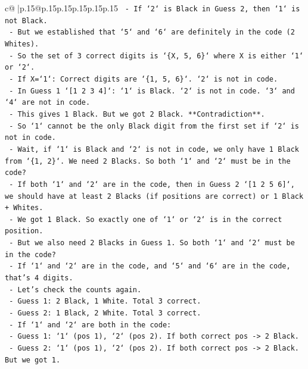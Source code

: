 \documentclass{article}
\begin{document}
{\begin{supertabular}{c@{$\;$}|p{.15\linewidth}@{}p{.15\linewidth}p{.15\linewidth}p{.15\linewidth}p{.15\linewidth}p{.15\linewidth}}
{{{\texttt{                {-} If `2` is Black in Guess 2, then `1` is not Black.} \\
\texttt{                {-} But we established that `5` and `6` are definitely in the code (2 Whites).} \\
\texttt{                {-} So the set of 3 correct digits is `\{X, 5, 6\}` where X is either `1` or `2`.} \\
\texttt{                {-} If X=`1`: Correct digits are `\{1, 5, 6\}`. `2` is not in code.} \\
\texttt{                    {-} In Guess 1 `{[}1 2 3 4{]}`: `1` is Black. `2` is not in code. `3` and `4` are not in code.} \\
\texttt{                    {-} This gives 1 Black. But we got 2 Black. **Contradiction**.} \\
\texttt{                    {-} So `1` cannot be the only Black digit from the first set if `2` is not in code.} \\
\texttt{                    {-} Wait, if `1` is Black and `2` is not in code, we only have 1 Black from `\{1, 2\}`. We need 2 Blacks. So both `1` and `2` must be in the code?} \\
\texttt{                    {-} If both `1` and `2` are in the code, then in Guess 2 `{[}1 2 5 6{]}`, we should have at least 2 Blacks (if positions are correct) or 1 Black + Whites.} \\
\texttt{                    {-} We got 1 Black. So exactly one of `1` or `2` is in the correct position.} \\
\texttt{                    {-} But we also need 2 Blacks in Guess 1. So both `1` and `2` must be in the code?} \\
\texttt{                    {-} If `1` and `2` are in the code, and `5` and `6` are in the code, that's 4 digits.} \\
\texttt{                    {-} Let's check the counts again.} \\
\texttt{                    {-} Guess 1: 2 Black, 1 White. Total 3 correct.} \\
\texttt{                    {-} Guess 2: 1 Black, 2 White. Total 3 correct.} \\
\texttt{                    {-} If `1` and `2` are both in the code:} \\
\texttt{                        {-} Guess 1: `1` (pos 1), `2` (pos 2). If both correct pos {-}> 2 Black.} \\
\texttt{                        {-} Guess 2: `1` (pos 1), `2` (pos 2). If both correct pos {-}> 2 Black. But we got 1.} \\
}}}
\end{supertabular}}
\end{document}
